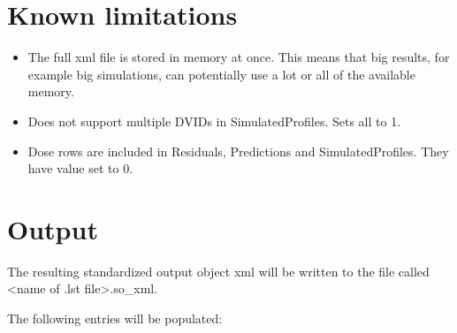 \section{Known limitations}
\begin{itemize}
    \item The full xml file is stored in memory at once. This means that big results, for example big simulations, can potentially use a lot or all of the available memory.
    \item Does not support multiple DVIDs in SimulatedProfiles. Sets all to 1.
    \item Dose rows are included in Residuals, Predictions and SimulatedProfiles. They have value set to 0.
\end{itemize}
\section{Output}

The resulting standardized output object xml will be written to the file called <name of .lst file>.so\_xml.

The following entries will be populated:


